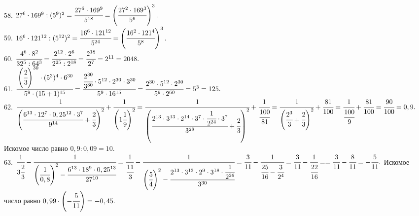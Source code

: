 58. $27^6\cdot169^9:(5^9)^2=\cfrac{27^6\cdot169^9}{5^{18}}=\left(\cfrac{27^2\cdot169^3}{5^6}\right)^3.$\\
59. $16^6\cdot121^{12}:(5^{12})^2=\cfrac{16^6\cdot121^{12}}{5^{24}}=\left(\cfrac{16^2\cdot121^4}{5^8}\right)^3.$\\
60. $\cfrac{4^6\cdot 8^2}{32^5:64^3}=\cfrac{2^{12}\cdot 2^6}{2^{25}:2^{18}}=\cfrac{2^{18}}{2^7}=2^{11}=2048.$\\
61. $\cfrac{\left(\cfrac{2}{3}\right)^{30}\cdot(5^3)^4\cdot6^{30}}{5^9\cdot(15+1)^{15}}=\cfrac{\cfrac{2^{30}}{3^{30}}\cdot5^{12}\cdot2^{30}\cdot3^{30}}{5^9\cdot16^{15}}=
\cfrac{2^{30}\cdot5^{12}\cdot2^{30}}{5^9\cdot2^{60}}=5^3=125.$\\
62. $\cfrac{1}{\left(\cfrac{6^{13}\cdot12^7\cdot0,25^{12}\cdot3^7}{9^{14}}+\cfrac{2}{3}\right)^2}+\cfrac{1}{\left(1\cfrac{1}{9}\right)^2}=
\cfrac{1}{\left(\cfrac{2^{13}\cdot3^{13}\cdot2^{14}\cdot3^7\cdot\cfrac{1}{2^{24}}\cdot3^7}{3^{28}}+\cfrac{2}{3}\right)^2}+\cfrac{1}{\cfrac{100}{81}}=
\cfrac{1}{\left(\cfrac{2^3}{3}+\cfrac{2}{3}\right)^2}+\cfrac{81}{100}=
\cfrac{1}{\cfrac{100}{9}}+\cfrac{81}{100}=\cfrac{90}{100}=0,9.$
Искомое число равно $0,9:0,09=10.$\\
63. $\cfrac{1}{3\cfrac{2}{3}}-\cfrac{1}{\left(\cfrac{1}{0,8}\right)^2-\cfrac{6^{13}\cdot18^9\cdot0,25^{13}}{27^{10}}}=
\cfrac{1}{\cfrac{11}{3}}-\cfrac{1}{\left(\cfrac{5}{4}\right)^2-\cfrac{2^{13}\cdot3^{13}\cdot2^9\cdot3^{18}\cdot\cfrac{1}{2^{26}}}{3^{30}}}=
\cfrac{3}{11}-\cfrac{1}{\cfrac{25}{16}-\cfrac{3}{2^4}}=\cfrac{3}{11}-\cfrac{1}{\cfrac{22}{16}}=
=\cfrac{3}{11}-\cfrac{8}{11}=-\cfrac{5}{11}.$
Искомое число равно $0,99\cdot\left(-\cfrac{5}{11}\right)=-0,45.$
\newpage
